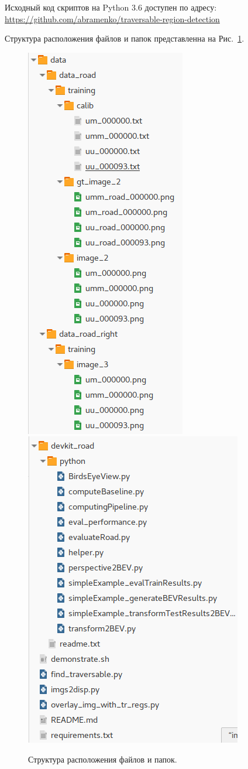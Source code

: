\documentclass[oneside,final,12pt]{scrartcl}
\begin{document}
	Исходный код скриптов на Python 3.6 доступен по адресу: \href{https://github.com/abramenko/traversable-region-detection}{https://github.com/abramenko/traversable-region-detection}

	Структура расположения файлов и папок представленна на Рис.~\ref{fig:repo_dir_struct}.

	\begin{figure}[h]
		\centering
		\includegraphics[width=0.3\linewidth]{repo_dir_struct_1.png}
		\includegraphics[width=0.4\linewidth]{repo_dir_struct_2.png}
		\caption{Структура расположения файлов и папок.}
		\label{fig:repo_dir_struct}
	\end{figure}
\end{document}
